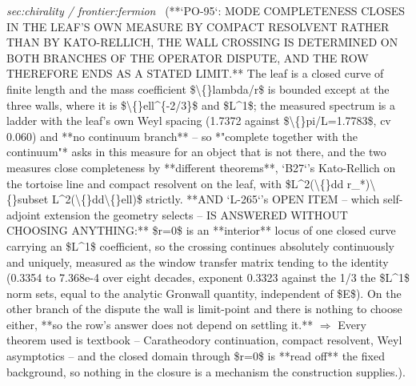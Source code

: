\begin{description}
\textit{sec:chirality / frontier:fermion} \ (**`PO-95`: MODE COMPLETENESS CLOSES IN THE LEAF'S OWN MEASURE BY COMPACT RESOLVENT RATHER THAN BY KATO-RELLICH, THE WALL CROSSING IS DETERMINED ON BOTH BRANCHES OF THE OPERATOR DISPUTE, AND THE ROW THEREFORE ENDS AS A STATED LIMIT.** The leaf is a closed curve of finite length and the mass coefficient \$\textbackslash\{\}lambda/r\$ is bounded except at the three walls, where it is \$\textbackslash\{\}ell\textasciicircum{}\{-2/3\}\$ and \$L\textasciicircum{}1\$; the measured spectrum is a ladder with the leaf's own Weyl spacing (1.7372 against \$\textbackslash\{\}pi/L=1.7783\$, cv 0.060) and **no continuum branch** -- so *"complete together with the continuum"* asks in this measure for an object that is not there, and the two measures close completeness by **different theorems**, `B27`'s Kato-Rellich on the tortoise line and compact resolvent on the leaf, with \$L\textasciicircum{}2(\textbackslash\{\}dd r\_*)\textbackslash\{\}subset L\textasciicircum{}2(\textbackslash\{\}dd\textbackslash\{\}ell)\$ strictly. **AND `L-265`'s OPEN ITEM -- which self-adjoint extension the geometry selects -- IS ANSWERED WITHOUT CHOOSING ANYTHING:** \$r=0\$ is an **interior** locus of one closed curve carrying an \$L\textasciicircum{}1\$ coefficient, so the crossing continues absolutely continuously and uniquely, measured as the window transfer matrix tending to the identity (0.3354 to 7.368e-4 over eight decades, exponent 0.3323 against the 1/3 the \$L\textasciicircum{}1\$ norm sets, equal to the analytic Gronwall quantity, independent of \$E\$). On the other branch of the dispute the wall is limit-point and there is nothing to choose either, **so the row's answer does not depend on settling it.** \ensuremath{\Rightarrow} Every theorem used is textbook -- Caratheodory continuation, compact resolvent, Weyl asymptotics -- and the closed domain through \$r=0\$ is **read off** the fixed background, so nothing in the closure is a mechanism the construction supplies.). 

\end{description}

